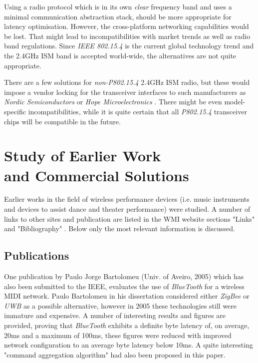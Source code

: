   Using a radio protocol which is in its own \emph{clear} frequency
 band and uses a minimal communication abstraction stack, should be
 more appropriate for latency optimisation. However, the cross-platform
 networking capabilities would be lost. That might lead to incompatibilities
 with market trends as well as radio band regulations.
  Since \emph{IEEE 802.15.4} is the current global technology trend and
 the 2.4GHz ISM band is accepted world-wide, the alternatives are not
 quite appropriate.

  There are a few solutions for \emph{non-P802.15.4} 2.4GHz ISM radio,
 but these would impose a vendor locking for the transceiver interfaces
 to such manufacturers as \emph{Nordic Semiconductors} \cite{links:nordic:rf2400}
 or \emph{Hope Microelectronics} \cite{links:hoperf:rf2400}.
 There might be even model-specific incompatibilities, while 
 it is quite certain that all \emph{P802.15.4} transceiver
 chips will be compatible in the future.

\break

\section{Study of Earlier Work \\and Commercial Solutions}

  Earlier works in the field of wireless performance devices (i.e. music instruments and
  devices to assist dance and theater performance) were studied. A number of links to
  other sites and publication are listed in the WMI website sections "Links" \cite{wmi:wiki:links}
  and "Bibliography" \cite{wmi:wiki:refs}. Below only the most relevant information is discussed.

\subsection{Publications}

  One publication by Paulo Jorge Bartolomeu (Univ. of Aveiro, 2005)
 \cite{pub:bartolomeu2005} which has also been submitted to the IEEE,
 evaluates the use of \emph{BlueTooth} for a wireless MIDI network.
 Paulo Bartolomeu in his dissertation considered either \emph{ZigBee} or
 \emph{UWB} as a possible alternative, however in 2005 these technologies
 still were immature and expensive. A number of interesting results and
 figures are provided, proving that \emph{BlueTooth} exhibits a definite
 byte latency of, on average, 20ms and a maximum of 100ms, these figures
 were reduced with improved network configuration to an average byte latency
 below 10ms. A quite interesting "command aggregation algorithm" had also
 been proposed in this paper.

